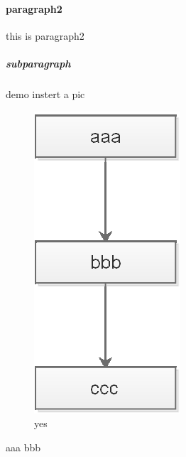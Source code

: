 \documentclass{article}
\begin{document}
\begin{CJK}{UTF8}{gbsn}
	\paragraph{paragraph2}
	this is paragraph2
	\subparagraph{subparagraph}
	\par 
	demo instert a pic\\
	\begin{figure}[H]
	\centering
	\includegraphics{test.eps}
	\caption{yes}
	\label{1}
	\end{figure}

	\begin{thebibliography}{123}
			aaa
			bbb
	\end{thebibliography}

\end{CJK}
\end{document}
